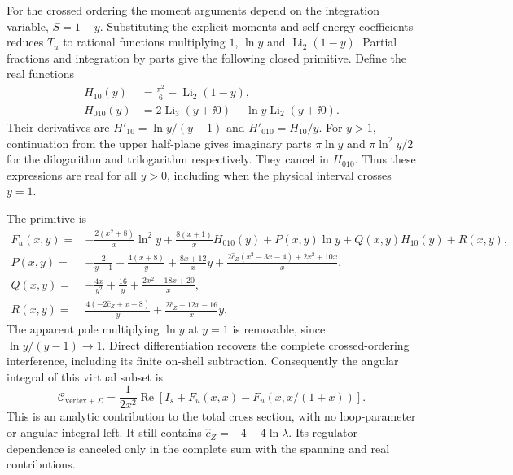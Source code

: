 For the crossed ordering the moment arguments depend on the
integration variable, $S=1-y$. Substituting the explicit moments
and self-energy coefficients reduces $T_u$ to rational functions
multiplying $1$, $\ln y$ and $\operatorname{Li}_2(1-y)$.
Partial fractions and integration by parts give the following
closed primitive. Define the real functions
\begin{align}
 H_{10}(y)&=\frac{\pi^2}6-\operatorname{Li}_2(1-y),\\
 H_{010}(y)&=2\operatorname{Li}_3(y+\ii0)
                        -\ln y\operatorname{Li}_2(y+\ii0).
\end{align}
Their derivatives are $H'_{10}=\ln y/(y-1)$ and
$H'_{010}=H_{10}/y$. For $y>1$, continuation from the upper
half-plane gives imaginary parts $\pi\ln y$ and
$\pi\ln^2y/2$ for the dilogarithm and trilogarithm respectively.
They cancel in $H_{010}$. Thus these expressions are real for all
$y>0$, including when the physical interval crosses $y=1$.

The primitive is
\begin{align}
 F_u(x,y)={}&-\frac{2(x^2+8)}x\ln^2y
       +\frac{8(x+1)}x H_{010}(y)
       +P(x,y)\ln y+Q(x,y)H_{10}(y)+R(x,y),\\
 P(x,y)={}&-\frac2{y-1}-\frac{4(x+8)}y
       +\frac{8x+12}{x}y
       +\frac{2\widehat c_Z(x^2-3x-4)+2x^2+10x}{x},\\
 Q(x,y)={}&-\frac{4x}{y^2}+\frac{16}y
                         +\frac{2x^2-18x+20}{x},\\
 R(x,y)={}&\frac{4(-2\widehat c_Z+x-8)}y
                 +\frac{2\widehat c_Z-12x-16}{x}y.
 \label{eq:comp-vt-u-primitive}
\end{align}
The apparent pole multiplying $\ln y$ at $y=1$ is removable,
since $\ln y/(y-1)\to1$. Direct differentiation recovers the
complete crossed-ordering interference, including its finite
on-shell subtraction. Consequently the angular integral of this
virtual subset is
\begin{equation}
 \boxed{\mathcal C_{\mathrm{vertex}+\Sigma}
 =\frac1{2x^2}\operatorname{Re}
       [I_s+F_u(x,x)-F_u(x,x/(1+x))].}
 \label{eq:comp-vt-integrated}
\end{equation}
This is an analytic contribution to the total cross section, with
no loop-parameter or angular integral left. It still contains
$\widehat c_Z=-4-4\ln\lambda$. Its regulator dependence is canceled
only in the complete sum with the spanning and real contributions.

